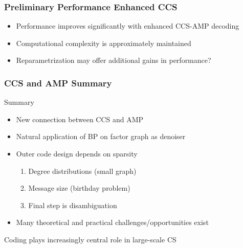 
\begin{frame}
\frametitle{Preliminary Performance Enhanced CCS}
\centerline{
  \scalebox{0.65}{}
  \scalebox{0.65}{}}
\vspace{5mm}
\begin{itemize}
\item Performance improves significantly with enhanced CCS-AMP decoding
\item Computational complexity is approximately maintained
\item Reparametrization may offer additional gains in performance?
\end{itemize}
\end{frame}


\begin{frame}
\frametitle{CCS and AMP Summary}
\begin{block}{Summary}
\begin{itemize}
\item New connection between CCS and AMP
\item Natural application of BP on factor graph as denoiser
\item Outer code design depends on sparsity
\begin{enumerate}
\item Degree distributions (small graph)
\item Message size (birthday problem)
\item Final step is disambiguation
\end{enumerate}
\item Many theoretical and practical challenges/opportunities exist
\end{itemize}
\end{block}
\begin{center}
\scalebox{0.75}{}
\end{center}
\centerline{Coding plays increasingly central role in large-scale CS}
\end{frame}


